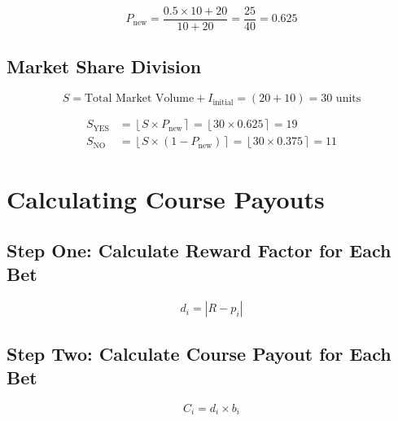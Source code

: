 \documentclass{article}
\begin{document}
\[
P_{\text{new}} = \frac{0.5 \times 10 + 20}{10 + 20} = \frac{25}{40} = 0.625
\]

\subsection*{Market Share Division}

\[
S = \text{Total Market Volume} + I_{\text{initial}} = (20 + 10) = 30 \text{ units}
\]

\begin{align*}
S_{\text{YES}} &= \left\lfloor S \times P_{\text{new}} \right\rceil = \left\lfloor 30 \times 0.625 \right\rceil = 19 \\
S_{\text{NO}} &= \left\lfloor S \times (1 - P_{\text{new}}) \right\rceil = \left\lfloor 30 \times 0.375 \right\rceil = 11
\end{align*}

\begin{center}
\end{center}

\section*{Calculating Course Payouts}


\subsection*{Step One: Calculate Reward Factor for Each Bet}

\[
d_i = |R - p_i|
\]

\subsection*{Step Two: Calculate Course Payout for Each Bet}

\[
C_i = d_i \times b_i
\]
\end{document}
